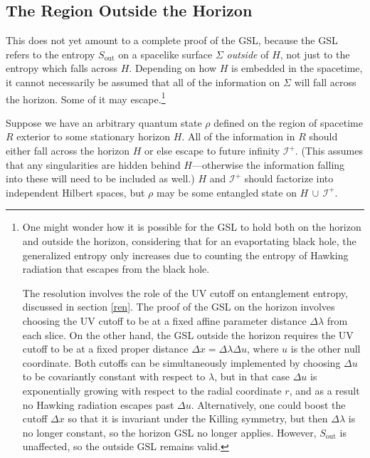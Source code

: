 \documentclass{article}
\begin{document}
\subsection{The Region Outside the Horizon}\label{outside}

This does not yet amount to a complete proof of the GSL, because the GSL refers to the entropy $S_\mathrm{out}$ on a spacelike surface $\Sigma$ \emph{outside} of $H$, not just to the entropy which falls across $H$.  Depending on how $H$ is embedded in the spacetime, it cannot necessarily be assumed that all of the information on $\Sigma$ will fall across the horizon.  Some of it may escape.\footnote{One might wonder how it is possible for the GSL to hold both on the horizon and outside the horizon, considering that for an evaportating black hole, the generalized entropy only increases due to counting the entropy of Hawking radiation that escapes from the black hole.

The resolution involves the role of the UV cutoff on entanglement entropy, discussed in section \ref{ren}.  The proof of the GSL on the horizon involves choosing the UV cutoff to be at a fixed affine parameter distance $\Delta \lambda$ from each slice.  On the other hand, the GSL outside the horizon requires the UV cutoff to be at a fixed proper distance $\Delta x = \Delta \lambda \Delta u$, where $u$ is the other null coordinate.  Both cutoffs can be simultaneously implemented by choosing $\Delta u$ to be covariantly constant with respect to $\lambda$, but in that case $\Delta u$ is exponentially growing with respect to the radial coordinate $r$, and as a result no Hawking radiation escapes past $\Delta u$.  Alternatively, one could boost the cutoff $\Delta x$ so that it is invariant under the Killing symmetry, but then $\Delta \lambda$ is no longer constant, so the horizon GSL no longer applies.  However, $S_\mathrm{out}$ is unaffected, so the outside GSL remains valid.}

Suppose we have an arbitrary quantum state $\rho$ defined on the region of spacetime $R$ exterior to some stationary horizon $H$.  All of the information in $R$ should either fall across the horizon $H$ or else escape to future infinity $\mathcal{I}^+$.  (This assumes that any singularities are hidden behind $H$---otherwise the information falling into these will need to be included as well.)  $H$ and $\mathcal{I}^+$ should factorize into independent Hilbert spaces, but $\rho$ may be some entangled state on $H\,\cup\,\mathcal{I}^+$.
\end{document}
